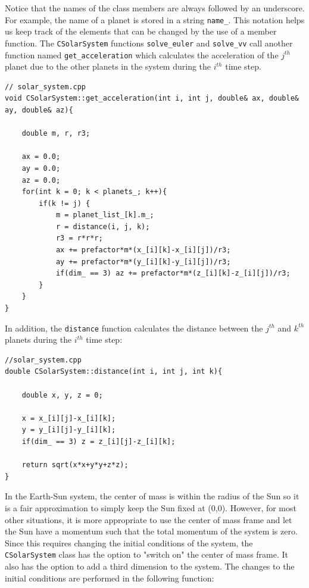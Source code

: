 \documentclass[prb,aps,twocolumn,showpacs,10pt]{revtex4-1}
\begin{document}
Notice that the names of the class members are always followed by an underscore. For example, the name of a planet is stored in a string \texttt{name\_}. This notation helps us keep track of the elements that can be changed by the use of a member function. The \texttt{CSolarSystem} functions \texttt{solve\_euler} and \texttt{solve\_vv} call another function named \texttt{get\_acceleration} which calculates the acceleration of the $j^{th}$ planet due to the other planets in the system during the $i^{th}$ time step.
\begin{lstlisting}
// solar_system.cpp
void CSolarSystem::get_acceleration(int i, int j, double& ax, double& ay, double& az){

	double m, r, r3;

	ax = 0.0;
	ay = 0.0;
	az = 0.0;
	for(int k = 0; k < planets_; k++){
		if(k != j) {
			m = planet_list_[k].m_;
			r = distance(i, j, k);
			r3 = r*r*r;
			ax += prefactor*m*(x_[i][k]-x_[i][j])/r3;
			ay += prefactor*m*(y_[i][k]-y_[i][j])/r3;	
			if(dim_ == 3) az += prefactor*m*(z_[i][k]-z_[i][j])/r3;	
		}
	}	
}
\end{lstlisting}
In addition, the \texttt{distance} function calculates the distance between the $j^{th}$ and $k^{th}$ planets during the $i^{th}$ time step:
\begin{lstlisting}
//solar_system.cpp
double CSolarSystem::distance(int i, int j, int k){

	double x, y, z = 0;

	x = x_[i][j]-x_[i][k];
	y = y_[i][j]-y_[i][k];
	if(dim_ == 3) z = z_[i][j]-z_[i][k];

	return sqrt(x*x+y*y+z*z);
}
\end{lstlisting}
In the Earth-Sun system, the center of mass is within the radius of the Sun so it is a fair approximation to simply keep the Sun fixed at (0,0). However, for most other situations, it is more appropriate to use the center of mass frame and let the Sun have a momentum such that the total momentum of the system is zero. Since this requires changing the initial conditions of the system, the \texttt{CSolarSystem} class has the option to "switch on" the center of mass frame. It also has the option to add a third dimension to the system.  The changes to the initial conditions are performed in the following function:
\end{document}
